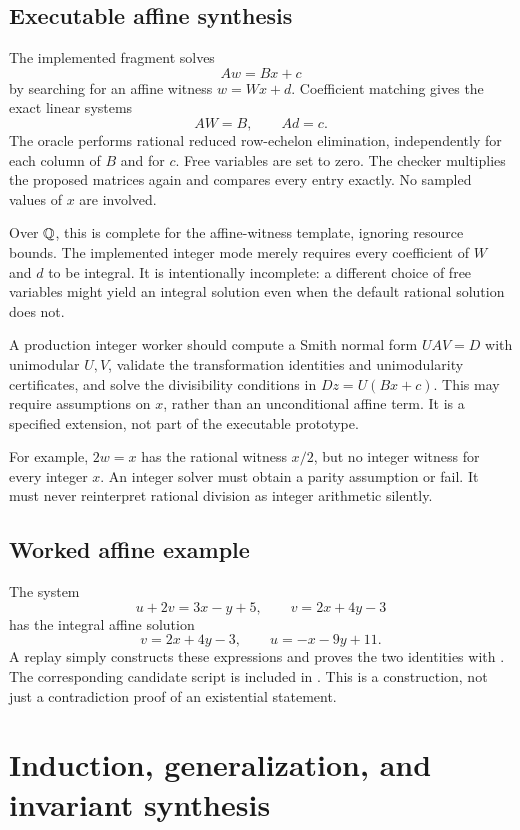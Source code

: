 \subsection{Executable affine synthesis}

The implemented fragment solves
\[
  A w=B x+c
\]
by searching for an affine witness $w=W x+d$. Coefficient matching gives the exact linear systems
\[
  A W=B,\qquad A d=c.
\]
The oracle performs rational reduced row-echelon elimination, independently for each column of $B$ and for $c$. Free variables are set to zero. The checker multiplies the proposed matrices again and compares every entry exactly. No sampled values of $x$ are involved.

Over $\mathbb{Q}$, this is complete for the affine-witness template, ignoring resource bounds. The implemented integer mode merely requires every coefficient of $W$ and $d$ to be integral. It is intentionally incomplete: a different choice of free variables might yield an integral solution even when the default rational solution does not.

A production integer worker should compute a Smith normal form $UAV=D$ with unimodular $U,V$, validate the transformation identities and unimodularity certificates, and solve the divisibility conditions in $D z=U(Bx+c)$. This may require assumptions on $x$, rather than an unconditional affine term. It is a specified extension, not part of the executable prototype.

For example, $2w=x$ has the rational witness $x/2$, but no integer witness for every integer $x$. An integer solver must obtain a parity assumption or fail. It must never reinterpret rational division as integer arithmetic silently.

\subsection{Worked affine example}

The system
\[
 u+2v=3x-y+5,\qquad v=2x+4y-3
\]
has the integral affine solution
\[
 v=2x+4y-3,\qquad u=-x-9y+11.
\]
A replay simply constructs these expressions and proves the two identities with . The corresponding candidate script is included in . This is a construction, not just a contradiction proof of an existential statement.

\section{Induction, generalization, and invariant synthesis}

